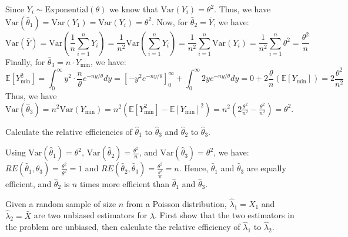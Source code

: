 \documentclass{article}
\newcommand{\E}{\mathbb{E}}
\newcommand{\V}{\text{Var}}
\begin{document}
\begin{probset}
\begin{prob}[\textbf{5.4.19}]
\begin{subprobset}
\begin{subprob}
        \begin{soln}
            Since $Y_i \sim \text{Exponential}(\theta)$ we know that $\V(Y_i) = \theta^2$. Thus, we have $\V(\hat\theta_1) = \V(Y_1) = \V(Y_i) = \theta^2$. Now, for $\hat\theta_2 = \bar Y$, we have:
            \[
                \V(\bar Y) = \V\left( \frac{1}{n} \sum_{i=1}^n Y_i \right) = \frac{1}{n^2} \V\left( \sum_{i=1}^n Y_i \right) = \frac{1}{n^2} \sum_{i=1}^n \V(Y_i) = \frac{1}{n^2} \sum_{i=1}^n \theta^2 = \frac{\theta^2}{n}
            \]
            Finally, for $\hat\theta_3 = n \cdot Y_{\min}$, we have:
            \[
                \E[Y_{\min}^2] = \int_0^{\infty} y^2 \cdot \frac{n}{\theta} e^{-ny/\theta} dy = \left[-y^2 e^{-ny/\theta}\right]_0^{\infty} + \int_0^{\infty} 2y e^{-ny/\theta} dy = 0 + 2\frac{\theta}{n}(\E[Y_{\min}]) = 2\frac{\theta^2}{n^2}
            \]
            Thus, we have $\V(\hat\theta_3) = n^2\V(Y_{\min}) = n^2(\E[Y_{\min}^2] - \E[Y_{\min}]^2) = n^2(2\frac{\theta^2}{n^2} - \frac{\theta^2}{n^2}) = \theta^2$.
        \end{soln}
    \end{subprob}

    \begin{subprob}
        Calculate the relative efficiencies of $\hat{\theta}_1$ to $\hat{\theta}_3$ and $\hat{\theta}_2$ to $\hat{\theta}_3$.

        \begin{soln}
            Using $\V(\hat\theta_1) = \theta^2$, $\V(\hat\theta_2) = \frac{\theta^2}{n}$, and $\V(\hat\theta_3) = \theta^2$, we have: $RE(\hat\theta_1, \hat\theta_3) = \frac{\theta^2}{\theta^2} = 1$ and $RE(\hat\theta_2, \hat\theta_3) = \frac{\theta^2}{\frac{\theta^2}{n}} = n$. Hence, $\hat\theta_1$ and $\hat\theta_3$ are equally efficient, and $\hat\theta_2$ is $n$ times more efficient than $\hat\theta_1$ and $\hat\theta_3$.
        \end{soln}
    \end{subprob}
    \end{subprobset}
\end{prob}

\newpage

\begin{prob}[\textbf{5.4.20}]
    Given a random sample of size $n$ from a Poisson distribution, $\hat{\lambda}_1 = X_1$ and $\hat{\lambda}_2 = \bar X$ are two unbiased estimators for $\lambda$. First show that the two estimators in the problem are unbiased, then calculate the relative efficiency of $\hat{\lambda}_1$ to $\hat{\lambda}_2$.


\end{prob}
\end{probset}
\end{document}

